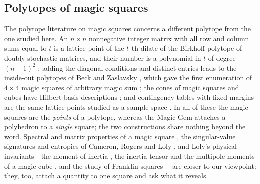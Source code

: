 \subsection{Polytopes of magic squares}
\label{sec:bg_polytopes}

The polytope literature on magic squares concerns a different polytope from the one studied here.
An $n\times n$ nonnegative integer matrix with all row and column sums equal to $t$ is a lattice point of the $t$-th dilate of the Birkhoff polytope of doubly stochastic matrices, and their number is a polynomial in $t$ of degree $(n-1)^2$ \cite{stanley1973magic,ehrhart1973magic,ziegler1995lectures}; adding the diagonal conditions and distinct entries leads to the inside-out polytopes of Beck and Zaslavsky \cite{beck2006insideout}, which gave the first enumeration of $4\times4$ magic squares of arbitrary magic sum \cite{beck2010enumeration}; the cones of magic squares and cubes have Hilbert-basis descriptions \cite{ahmed2003polyhedral}; and contingency tables with fixed margins are the same lattice points studied as a sample space \cite{diaconis1995rectangular}.
In all of these the magic squares are the \emph{points} of a polytope, whereas the Magic Gem attaches a polyhedron to a \emph{single} square; the two constructions share nothing beyond the word.
Spectral and matrix properties of a magic square \cite{loly2009spectra,nordgren2012properties,nordgren2014spectra}, the singular-value signatures and entropies of Cameron, Rogers and Loly \cite{cameron2013signatura}, and Loly's physical invariants---the moment of inertia \cite{loly2004invariance}, the inertia tensor and the multipole moments of a magic cube \cite{rogers2004inertia,rogers2005multipole}, and the study of Franklin squares \cite{loly2007franklin}---are closer to our viewpoint: they, too, attach a quantity to one square and ask what it reveals.
